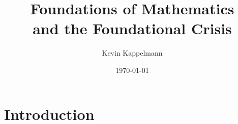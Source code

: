 \documentclass{beamer}
\title[Mathematical Foundations and the Foundational Crisis]{Foundations of Mathematics\\and the Foundational Crisis} %
\author{Kevin Kappelmann} %
\institute[TUM] %
{Technical University of Munich}
\date{\today} %
\begin{document}
\begin{frame}
\titlepage %
\end{frame}

\section*{Introduction}
\end{document}

